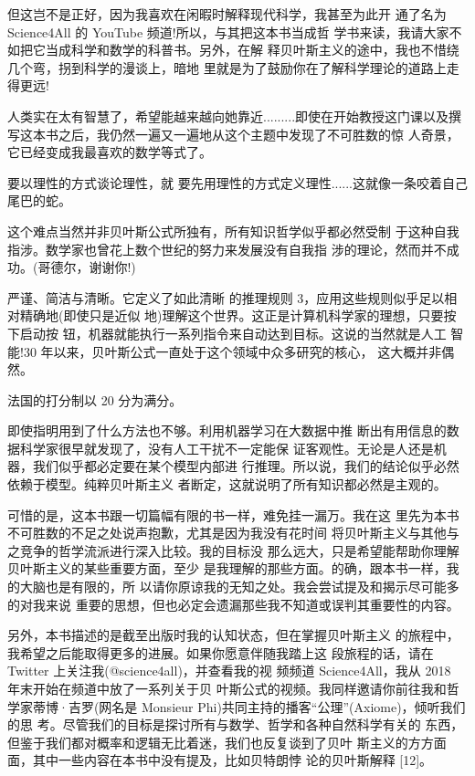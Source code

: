 但这岂不是正好，因为我喜欢在闲暇时解释现代科学，我甚至为此开 通了名为 Science4All 的 YouTube 频道!所以，与其把这本书当成哲 学书来读，我请大家不如把它当成科学和数学的科普书。另外，在解 释贝叶斯主义的途中，我也不惜绕几个弯，拐到科学的漫谈上，暗地 里就是为了鼓励你在了解科学理论的道路上走得更远!



人类实在太有智慧了，希望能越来越向她靠近.........即使在开始教授这门课以及撰写这本书之后，我仍然一遍又一遍地从这个主题中发现了不可胜数的惊 人奇景，它已经变成我最喜欢的数学等式了。





要以理性的方式谈论理性，就 要先用理性的方式定义理性......这就像一条咬着自己尾巴的蛇。

这个难点当然并非贝叶斯公式所独有，所有知识哲学似乎都必然受制
于这种自我指涉。数学家也曾花上数个世纪的努力来发展没有自我指
涉的理论，然而并不成功。(哥德尔，谢谢你!)



严谨、简洁与清晰。它定义了如此清晰 的推理规则 3，应用这些规则似乎足以相对精确地(即使只是近似 地)理解这个世界。这正是计算机科学家的理想，只要按下启动按 钮，机器就能执行一系列指令来自动达到目标。这说的当然就是人工 智能!30 年以来，贝叶斯公式一直处于这个领域中众多研究的核心， 这大概并非偶然。



法国的打分制以 20 分为满分。



即使指明用到了什么方法也不够。利用机器学习在大数据中推 断出有用信息的数据科学家很早就发现了，没有人工干扰不一定能保 证客观性。无论是人还是机器，我们似乎都必定要在某个模型内部进 行推理。所以说，我们的结论似乎必然依赖于模型。纯粹贝叶斯主义 者断定，这就说明了所有知识都必然是主观的。



可惜的是，这本书跟一切篇幅有限的书一样，难免挂一漏万。我在这
里先为本书不可胜数的不足之处说声抱歉，尤其是因为我没有花时间
将贝叶斯主义与其他与之竞争的哲学流派进行深入比较。我的目标没
那么远大，只是希望能帮助你理解贝叶斯主义的某些重要方面，至少
是我理解的那些方面。的确，跟本书一样，我的大脑也是有限的，所
以请你原谅我的无知之处。我会尝试提及和揭示尽可能多的对我来说
重要的思想，但也必定会遗漏那些我不知道或误判其重要性的内容。

另外，本书描述的是截至出版时我的认知状态，但在掌握贝叶斯主义 的旅程中，我希望之后能取得更多的进展。如果你愿意伴随我踏上这 段旅程的话，请在 Twitter 上关注我(@science4all)，并查看我的视 频频道 Science4All，我从 2018 年末开始在频道中放了一系列关于贝 叶斯公式的视频。我同样邀请你前往我和哲学家蒂博·吉罗(网名是 Monsieur Phi)共同主持的播客“公理”(Axiome)，倾听我们的思 考。尽管我们的目标是探讨所有与数学、哲学和各种自然科学有关的 东西，但鉴于我们都对概率和逻辑无比着迷，我们也反复谈到了贝叶 斯主义的方方面面，其中一些内容在本书中没有提及，比如贝特朗悖 论的贝叶斯解释 [12]。



